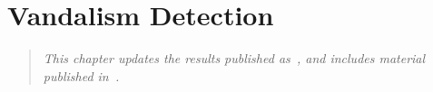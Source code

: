 \chapter{Vandalism Detection}
\label{ch:vandalism}

\begin{quote}
\textit{This chapter updates the results
published as~\cite{Adler2010b}, and includes material
published in~\cite{Adler2011a}.}
\end{quote}







